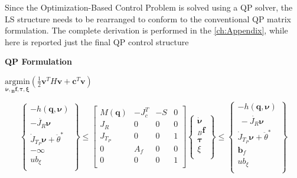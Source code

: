 Since the Optimization-Based Control Problem is solved using a QP solver, the LS structure needs to be rearranged to conform to the conventional QP matrix formulation.
The complete derivation is performed in the \cref{ch:Appendix}, while here is reported just the final QP control structure


\vspace{12pt}
\begin{center}
{\large \textbf{QP Formulation}}
\end{center}

\begin{center}
$\underset{\bm{\dot{\nu},{}_{B}\mathbf{f},\bm{\tau}}, \bm{\xi}}{\text{argmin}} (\frac{1}{2} \mathbf{v}^{T} H \mathbf{v} + \mathbf{c}^{T} \mathbf{v})$
\end{center}

\begin{equation}
\begin{Bmatrix} 
-h(\mathbf{q},\bm{\nu})\\
-\dot{J_{R}}\bm{\nu} \\
\dot{J}_{T_P}\bm{\nu} + \ddot{\theta}^{*}\\
-\bm{\infty} \\
ub_{\xi} \\
\end{Bmatrix} \leq \begin{bmatrix} 
M(\mathbf{q}) & -J_c^{T} & -S & 0 \\
J_{R} & 0 & 0  & 0\\
J_{T_P} & 0 & 0  & 1\\
0 & A_{f} & 0 & 0\\
0 & 0 & 0 & 1 \\
\end{bmatrix} \begin{Bmatrix} 
\dot{\bm{\nu}} \\
{}_{B}\mathbf{f} \\
\bm{\tau}  \\
\xi \\
\end{Bmatrix} \leq \begin{Bmatrix} 
-h(\mathbf{q},\bm{\nu})\\\
-\dot{J_{R}}\bm{\nu}\\
\dot{J}_{T_P}\bm{\nu} + \ddot{\theta}^{*} \\
\mathbf{b}_{f} \\
ub_{\xi} \\
\end{Bmatrix}
\label{eq: QP Formulation}
\end{equation}
